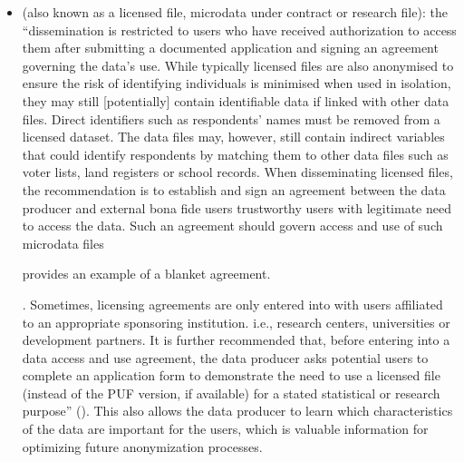\documentclass[letterpaper,10pt,english]{sphinxmanual}
\begin{document}
\begin{itemize}
\item {} 
 (also known as a licensed file,
microdata under contract or research file): the “dissemination is
restricted to users who have received authorization to access them
after submitting a documented application and signing an agreement
governing the data’s use. While typically licensed files are also
anonymised to ensure the risk of identifying individuals is minimised
when used in isolation, they may still {[}potentially{]} contain
identifiable data if linked with other data files. Direct identifiers
such as respondents’ names must be removed from a licensed dataset.
The data files may, however, still contain indirect variables that
could identify respondents by matching them to other data files such
as voter lists, land registers or school records. When disseminating
licensed files, the recommendation is to establish and sign an
agreement between the data producer and external bona fide users \textendash{}
trustworthy users with legitimate need to access the data. Such an
agreement should govern access and use of such microdata
files %
\begin{footnote}[2]\sphinxAtStartFootnote
{}
provides an example of a blanket agreement.
%
\end{footnote}. Sometimes, licensing agreements are only
entered into with users affiliated to an appropriate sponsoring
institution. i.e., research centers, universities or development
partners. It is further recommended that, before entering into a data
access and use agreement, the data producer asks potential users to
complete an application form to demonstrate the need to use a
licensed file (instead of the PUF version, if available) for a stated
statistical or research purpose” ({\hyperref[\detokenize{release_types:dubo10}]{}}). This also
allows the data producer to learn which characteristics of the data
are important for the users, which is valuable information for
optimizing future anonymization processes.


\end{itemize}
\end{document}

